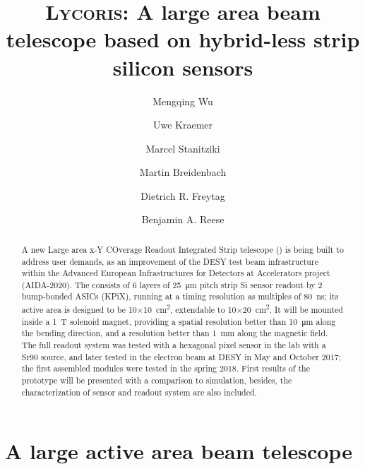 



\title{\textsc{Lycoris}: A large area beam telescope based on hybrid-less strip silicon sensors}
\author[*]{Mengqing Wu}
\author[*]{Uwe Kraemer}
\author[*]{Marcel Stanitziki}
\author[**]{Martin Breidenbach}
\author[**]{Dietrich R. Freytag}
\author[**]{Benjamin A. Reese}

\maketitle

\begin{abstract}

A new Large area x-Y COverage Readout Integrated Strip telescope (\lycoris) is being built to address user demands,
as an improvement of the DESY test beam infrastructure within the Advanced European Infrastructures for Detectors at Accelerators project (AIDA-2020).
The \lycoris consists of 6 layers of \SI{25}{\micro\metre} pitch strip Si sensor readout by 2 bump-bonded ASICs (KPiX),
running at a timing resolution as multiples of \SI{80}{\nano\second};
its active area is designed to be 10$\times$\SI{10}{\square\centi\metre}, extendable to 10$\times$\SI{20}{\square\centi\metre}.
It will be mounted inside a \SI{1}{\tesla} solenoid magnet,
providing a spatial resolution better than \SI{10}{\micro\metre} along the bending direction,
and a resolution better than \SI{1}{\milli\meter} along the magnetic field.
The full readout system was tested with a hexagonal pixel sensor in the lab with a Sr90 source,
and later tested in the electron beam at DESY in May and October 2017;
the first assembled modules were tested in the spring 2018.
First results of the \lycoris prototype will be presented with a comparison to simulation,
besides, the characterization of sensor and readout system are also included.
\end{abstract}

\section*{A large active area beam telescope}

